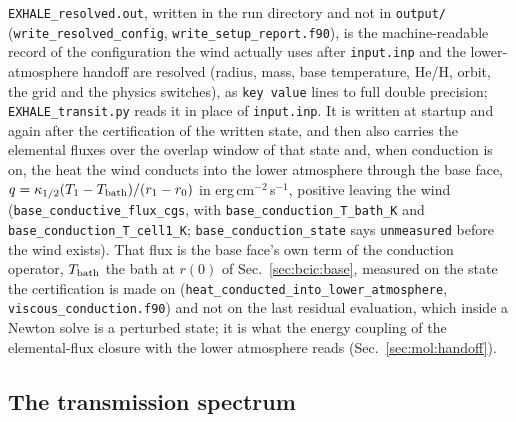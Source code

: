 \texttt{EXHALE\_resolved.out}, written in the run directory and not in
\texttt{output/} (\texttt{write\_resolved\_config},
\texttt{write\_setup\_report.f90}), is the machine-readable record of the
configuration the wind actually uses after \texttt{input.inp} and the
lower-atmosphere handoff are resolved (radius, mass, base temperature, He/H,
orbit, the grid and the physics switches), as \texttt{key value} lines to full
double precision; \texttt{EXHALE\_transit.py} reads it in place of
\texttt{input.inp}.  It is written at startup and again after the
certification of the written state, and then also carries the elemental
fluxes over the overlap window of that state and, when conduction is on, the
heat the wind conducts into the lower atmosphere through the base face,
$q = \kappa_{1/2}(T_1 - T_{\rm bath})/(r_1 - r_0)$ in
erg\,cm$^{-2}$\,s$^{-1}$, positive leaving the wind
(\texttt{base\_conductive\_flux\_cgs}, with \texttt{base\_conduction\_T\_bath\_K}
and \texttt{base\_conduction\_T\_cell1\_K}; \texttt{base\_conduction\_state}
says \texttt{unmeasured} before the wind exists).  That flux is the base
face's own term of the conduction operator, $T_{\rm bath}$ the bath at
$r(0)$ of Sec.~\ref{sec:bcic:base}, measured on the state the certification
is made on (\texttt{heat\_conducted\_into\_lower\_atmosphere},
\texttt{viscous\_conduction.f90}) and not on the last residual evaluation,
which inside a Newton solve is a perturbed state; it is what the energy
coupling of the elemental-flux closure with the lower atmosphere reads
(Sec.~\ref{sec:mol:handoff}).

\subsection{The transmission spectrum}
\label{sec:postprocessing:transit}

